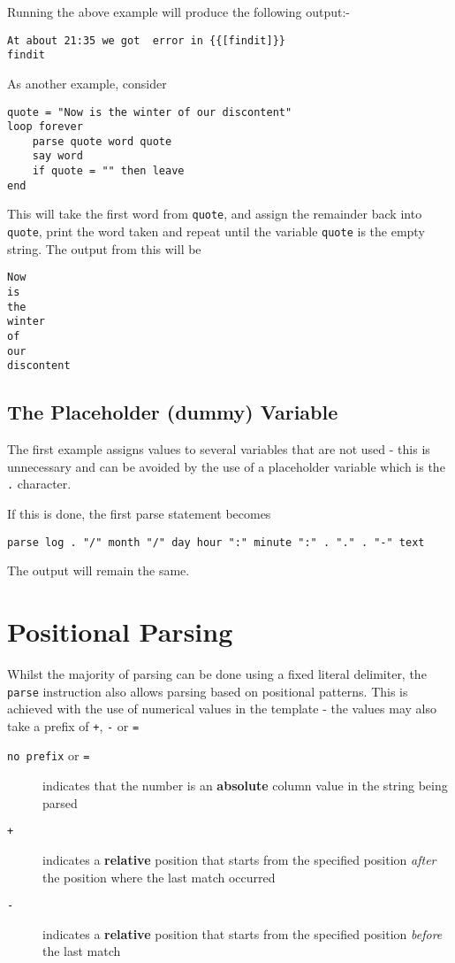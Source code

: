 {Running the above example will produce the following output:-
\begin{verbatim}
At about 21:35 we got  error in {{[findit]}} 
findit 
\end{verbatim}

As another example, consider
\begin{lstlisting}[label=WordSplitExample, caption=Parse Word-Split Example]
quote = "Now is the winter of our discontent"
loop forever
	parse quote word quote
	say word
	if quote = "" then leave
end
\end{lstlisting}
This will take the first word from \texttt{quote}, and assign the remainder back into \texttt{quote}, print the word taken and repeat until the variable \texttt{quote} is the empty string. The output from this will be
\begin{verbatim}
Now 
is 
the 
winter 
of 
our 
discontent
\end{verbatim}

\subsection{The Placeholder (dummy) Variable}
The first example assigns values to several variables that are not used - this is unnecessary and can be avoided by the use of a placeholder variable which is the \texttt{.} character.

If this is done, the first parse statement becomes
\begin{verbatim}
parse log . "/" month "/" day hour ":" minute ":" . "." . "-" text
\end{verbatim}
The output will remain the same.

\section{Positional Parsing}

Whilst the majority of parsing can be done using a fixed literal delimiter, the \texttt{parse} instruction also allows parsing based on positional patterns. This is achieved with the use of numerical values in the template - the values may also take a prefix of \texttt{+}, \texttt{-} or \texttt{=}

\begin{description}
\item[\texttt{no prefix} or \texttt{=}] indicates that the number is an \textbf{absolute} column value in the string being parsed
\item[\texttt{+}] indicates a \textbf{relative} position that starts from the specified position \textit{after} the position where the last match occurred
\item[\texttt{-}] indicates a \textbf{relative} position that starts from the specified position \textit{before} the last match
\end{description}

}
